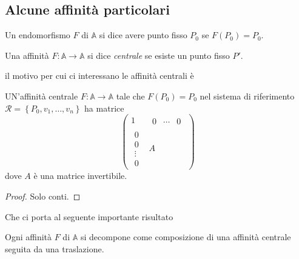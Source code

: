\documentclass[11pt]{scrartcl}
\renewcommand{\AA}{\mathbb{A}}
\begin{document}
   	 \subsection{Alcune affinità particolari}
   	 \begin{definition}
   	 	Un endomorfismo $F$ di $\AA$ si dice avere punto fisso $P_0$ se $F(P_0)=P_0$.
   	 \end{definition}
   	 \begin{definition}
   	 	Una affinità $F:\AA\to\AA$ si dice \textit{centrale} se esiste un punto fisso $P'$.
   	 \end{definition}
   	 il motivo per cui ci interessano le affinità centrali è
   	 \begin{lemma}
   	 	UN'affinità centrale $F:\AA\to\AA$ tale che $F(P_0)=P_0$ nel sistema di riferimento $\mathcal{R}=\left\{P_0,v_1,\dots,v_n\right\}$ ha matrice
   	 	$$\left(\begin{array}{c|c}
   	 		1 & \begin{array}{ccc}
   	 			0 & \cdots & 0 
   	 		\end{array} \\
   	 		\hline
   	 		\begin{array}{c}
   	 			0 \\
   	 			0 \\
   	 			\vdots \\
   	 			0
   	 		\end{array} & A
   	 	\end{array}\right)$$
   	 	dove $A$ è una matrice invertibile.
   	 \end{lemma}
   	 \begin{proof}
   	 	Solo conti.
   	 \end{proof}
   	 Che ci porta al seguente importante risultato
   	 \begin{lemma}
   	 	Ogni affinità $F$ di $\AA$ si decompone come composizione di una affinità centrale seguita da una traslazione.
   	 \end{lemma}
\end{document}
